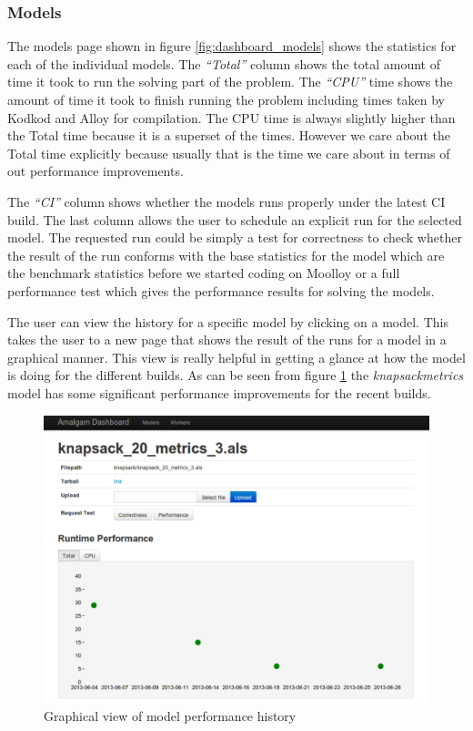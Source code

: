 \documentclass[11pt]{article}
\theoremstyle{definition}
\begin{document}
\subsubsection{Models}
The models page shown in figure \ref{fig:dashboard_models} shows the statistics for each of the individual models. The \emph{``Total''} column shows the total amount of time it took to run the solving part of the problem. The \emph{``CPU''} time shows the amount of time it took to finish running the problem including times taken by Kodkod and Alloy for compilation. The CPU time is always slightly higher than the Total time because it is a superset of the times. However we care about the Total time explicitly because usually that is the time we care about in terms of out performance improvements.

The \emph{``CI''} column shows whether the models runs properly under the latest CI build. The last column allows the user to schedule an explicit run for the selected model. The requested run could be simply a test for correctness to check whether the result of the run conforms with the base statistics for the model which are the benchmark statistics before we started coding on Moolloy or a full performance test which gives the performance results for solving the models.

The user can view the history for a specific model by clicking on a model. This takes the user to a new page that shows the result of the runs for a model in a graphical manner. This view is really helpful in getting a glance at how the model is doing for the different builds. As can be seen from figure \ref{fig:modelview} the \emph{knapsack\textunderscore metrics} model has some significant performance improvements for the recent builds.

\begin{figure}
	\caption{Graphical view of model performance history}\label{fig:modelview}
	\includegraphics[width=\textwidth]{images/model_view}
\end{figure}
\end{document}
